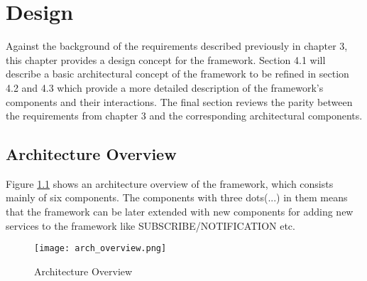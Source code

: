 \chapter{Design\label{cha:chapter4}}
Against the background of the requirements described previously in chapter 3, this chapter provides a design concept for the framework. Section 4.1 will describe a basic architectural concept of the framework to be refined in section 4.2 and 4.3 which provide a more detailed description of the framework's components and their interactions. The final section reviews the parity between the requirements from chapter 3 and the corresponding architectural components. 
        


\section{Architecture Overview\label{sec:des_ar_ov}}
Figure \ref{fig:arch_overview} shows an architecture overview of the framework, which consists mainly of six components. The components with three dots(...) in them means that the framework can be later extended with new components for adding new services to the framework like SUBSCRIBE/NOTIFICATION etc.

\begin{figure}[htb]
  \centering
  \texttt{[image: arch\_overview.png]}\\
  \caption{Architecture Overview}
  \label{fig:arch_overview}
\end{figure}

%
%


